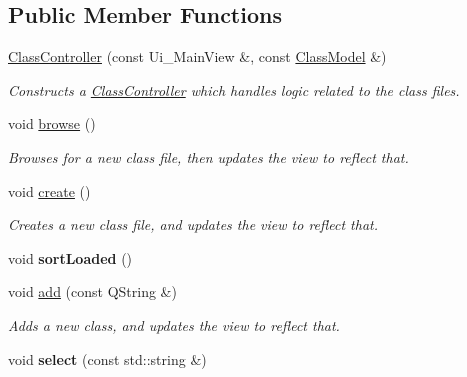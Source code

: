 \subsection*{Public Member Functions}
\begin{DoxyCompactItemize}
\item 
\hyperlink{classClassController_a6edb502072d6d3c5d7f1905ef4c7a81a}{Class\+Controller} (const Ui\+\_\+\+Main\+View \&, const \hyperlink{classClassModel}{Class\+Model} \&)
\begin{DoxyCompactList}\small\item\em Constructs a \hyperlink{classClassController}{Class\+Controller} which handles logic related to the class files. \end{DoxyCompactList}\item 
\mbox{\label{classClassController_a79b058a17a14de98aced16bbd7b00348}} 
void \hyperlink{classClassController_a79b058a17a14de98aced16bbd7b00348}{browse} ()
\begin{DoxyCompactList}\small\item\em Browses for a new class file, then updates the view to reflect that. \end{DoxyCompactList}\item 
\mbox{\label{classClassController_a334af2fa2b39883a1499947c7a623d23}} 
void \hyperlink{classClassController_a334af2fa2b39883a1499947c7a623d23}{create} ()
\begin{DoxyCompactList}\small\item\em Creates a new class file, and updates the view to reflect that. \end{DoxyCompactList}\item 
\mbox{\label{classClassController_aef5112f565abed11ca3eeab4cd9a58a4}} 
void {\bfseries sort\+Loaded} ()
\item 
void \hyperlink{classClassController_abd51fbe1d80458b68f2023742bb2723a}{add} (const Q\+String \&)
\begin{DoxyCompactList}\small\item\em Adds a new class, and updates the view to reflect that. \end{DoxyCompactList}\item 
\mbox{\label{classClassController_a18ab1138694d7ec3cb20ae6093491584}} 
void {\bfseries select} (const std\+::string \&)

\end{DoxyCompactItemize}
